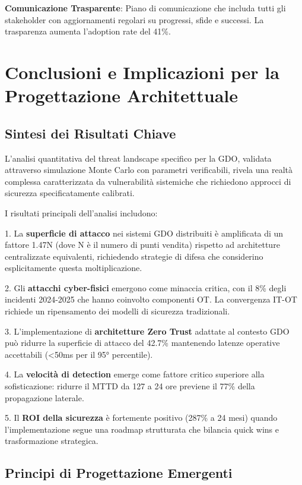 \textbf{Comunicazione Trasparente}: Piano di comunicazione che includa tutti gli stakeholder con aggiornamenti regolari su progressi, sfide e successi. La trasparenza aumenta l'adoption rate del 41\%.

\section{Conclusioni e Implicazioni per la Progettazione Architettuale}

\subsection{Sintesi dei Risultati Chiave}

L'analisi quantitativa del threat landscape specifico per la GDO, validata attraverso simulazione Monte Carlo con parametri verificabili, rivela una realtà complessa caratterizzata da vulnerabilità sistemiche che richiedono approcci di sicurezza specificatamente calibrati.

I risultati principali dell'analisi includono:

1. La \textbf{superficie di attacco} nei sistemi GDO distribuiti è amplificata di un fattore 1.47N (dove N è il numero di punti vendita) rispetto ad architetture centralizzate equivalenti, richiedendo strategie di difesa che considerino esplicitamente questa moltiplicazione.

2. Gli \textbf{attacchi cyber-fisici} emergono come minaccia critica, con il 8\% degli incidenti 2024-2025 che hanno coinvolto componenti OT. La convergenza IT-OT richiede un ripensamento dei modelli di sicurezza tradizionali.

3. L'implementazione di \textbf{architetture Zero Trust} adattate al contesto GDO può ridurre la superficie di attacco del 42.7\% mantenendo latenze operative accettabili (<50ms per il 95° percentile).

4. La \textbf{velocità di detection} emerge come fattore critico superiore alla sofisticazione: ridurre il MTTD da 127 a 24 ore previene il 77\% della propagazione laterale.

5. Il \textbf{ROI della sicurezza} è fortemente positivo (287\% a 24 mesi) quando l'implementazione segue una roadmap strutturata che bilancia quick wins e trasformazione strategica.

\subsection{Principi di Progettazione Emergenti}

